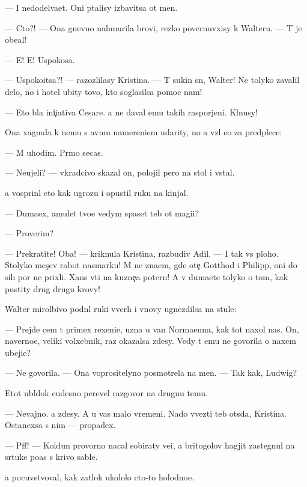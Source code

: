 \documentclass[10pt]{book}
\begin{document}
— I nedodel{\yi}va{\y}et. Oni p{\yi}talisy izbavitsa ot men{\ia}.

— Cto?! — Ona gnevno nahmurila brovi, rezko povernuvxisy k Walteru. — T{\yi} je obe{\x}al!

— E{\y}! E{\y}! Uspoko{\y}sa.

— Uspoko{\y}itsa?! — razozlilasy Kristina. — T{\yi} sukin s{\yi}n, Walter! Ne tolyko zavalil delo, no i hotel ubity tovo, kto soglasilsa pomoc nam!

— Eto b{\yi}la ini{\c}iativa Cesare. {\Y}a ne daval {\y}emu takih raspor{\ia}jeni{\y}. Kl{\ia}nusy!

Ona xagnula k nemu s {\y}avn{\yi}m namereni{\y}em udarity, no {\y}a vz{\ia}l {\y}e{\y}o za predplec{\y}e:

— M{\yi} uhodim. Pr{\ia}mo se{\y}cas.

— Neujeli? — vkradcivo skazal on, polojil pero na stol i vstal.

{\Y}a vosprin{\ia}l eto kak ugrozu i opustil ruku na kinjal.

— Duma{\y}ex, amulet tvo{\y}e{\y} vedym{\yi} spaset teb{\ia} ot magi{\y}i?

— Proverim?

— Prekratite! Oba! — kriknula Kristina, razbudiv Adil{\ia}. — I tak vs{\e} ploho. Stolyko mes{\ia}{\c}ev rabot{\yi} nasmarku! M{\yi} ne zna{\y}em, gde ote{\c} Gotthod i Philipp, oni do sih por ne prixli. Xans v{\yi}{\y}ti na kuzne{\c}a poter{\ia}n! A v{\yi} duma{\y}ete tolyko o tom, kak pustity drug drugu krovy!

Walter mirol{\iu}bivo podn{\ia}l ruki vverh i vnovy ugnezdilsa na stule:

— Prejde cem t{\yi} primex rexeni{\y}e, uzna{\y} u van Norma{\y}enna, kak tot naxol nas. On, naverno{\y}e, veliki{\y} volxebnik, raz okazalsa zdesy. Vedy t{\yi} {\y}emu ne govorila o naxem ubeji{\x}e?

— Ne govorila. — Ona voprositelyno posmotrela na men{\ia}. — Tak kak, Ludwig?

Etot ubl{\iu}dok cudesno perevel razgovor na drugu{\y}u temu.

— Nevajno. {\Y}a zdesy. A u vas malo vremeni. Nado v{\yi}vezti teb{\ia} ots{\iu}da, Kristina. Ostanexsa s nim — propadex.

— Pff! — Koldun provorno nacal sobiraty ve{\x}i, a britogolov{\yi}{\y} hagjit zastegnul na s{\iu}rtuke po{\y}as s krivo{\y} sable{\y}.

{\Y}a pocuvstvoval, kak zat{\yi}lok ukololo cto-to holodno{\y}e.
\end{document}
